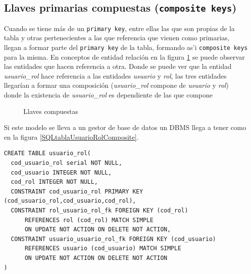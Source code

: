 \subsection{Llaves primarias compuestas (\texttt{composite keys})}
Cuando se tiene m\'as de un \texttt{primary key}, entre ellas las que son propias de la tabla y otras pertenecientes a las que referencia que vienen como primarias, llegan a formar parte del \texttt{primary key} de la tabla, formando as'i \texttt{composite keys} para la misma. En conceptos de entidad relaci\'on en la figura  \ref{fig:llaves compuestas} se puede observar  las entidades que hacen referencia a otra.
Donde se puede ver que la entidad \textit{usuario\_rol} hace referencia a las entidades \textit{usuario} y \textit{rol}, las tres entidades llegar\'ian a formar una composici\'on  (\textit{usuario\_rol} compone de \textit{usuario} y \textit{rol}) donde la existencia de \textit{usuario\_rol} es dependiente de las que compone
\begin{figure}[H]
\centering
{}
\caption{Llaves compuestas} \label{fig:llaves compuestas}
\end{figure}
Si este modelo se lleva a un gestor de base de datos un DBMS llega a tener como en la figura \ref{SQLtablaUsuarioRolComposite}.
\lstset{language=sql,breaklines=true}
\label{SQLtablaUsuarioRolComposite}
\begin{lstlisting}
CREATE TABLE usuario_rol(
  cod_usuario_rol serial NOT NULL,
  cod_usuario INTEGER NOT NULL,
  cod_rol INTEGER NOT NULL,
  CONSTRAINT cod_usuario_rol PRIMARY KEY (cod_usuario_rol,cod_usuario,cod_rol),
  CONSTRAINT rol_usuario_rol_fk FOREIGN KEY (cod_rol)
      REFERENCES rol (cod_rol) MATCH SIMPLE
      ON UPDATE NOT ACTION ON DELETE NOT ACTION,
  CONSTRAINT usuario_usuario_rol_fk FOREIGN KEY (cod_usuario)
      REFERENCES usuario (cod_usuario) MATCH SIMPLE
      ON UPDATE NOT ACTION ON DELETE NOT ACTION
)
\end{lstlisting}
